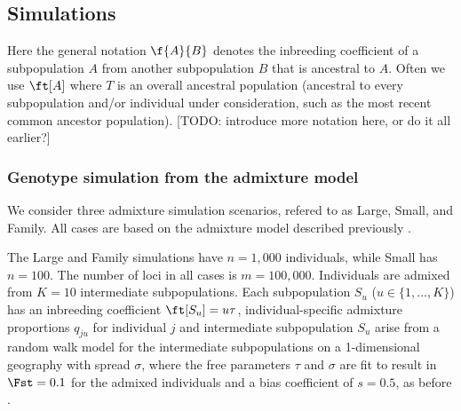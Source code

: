 \documentclass[11pt]{article}
\begin{document}
\subsection{Simulations}

Here the general notation $\f{A}{B}$ denotes the inbreeding coefficient of a subpopulation $A$ from another subpopulation $B$ that is ancestral to $A$.
Often we use $\ft[A]$ where $T$ is an overall ancestral population (ancestral to every subpopulation and/or individual under consideration, such as the most recent common ancestor population).
[TODO: introduce more notation here, or do it all earlier?]

\subsubsection{Genotype simulation from the admixture model}

We consider three admixture simulation scenarios, refered to as Large, Small, and Family.
All cases are based on the admixture model described previously \citep{ochoa_fst1, ochoa_estimating_2021}.

The Large and Family simulations have $n = 1,000$ individuals, while Small has $n = 100$.
The number of loci in all cases is $m = 100,000$.
Individuals are admixed from $K = 10$ intermediate subpopulations.
Each subpopulation $S_u$ ($u \in \{ 1, ..., K \}$) has an inbreeding coefficient $\ft[S_u] = u \tau$, individual-specific admixture proportions $q_{ju}$ for individual $j$ and intermediate subpopulation $S_u$ arise from a random walk model for the intermediate subpopulations on a 1-dimensional geography with spread $\sigma$, where the free parameters $\tau$ and $\sigma$ are fit to result in $\Fst = 0.1$ for the admixed individuals and a bias coefficient of $s = 0.5$, as before \citep{ochoa_estimating_2021}.
\end{document}
